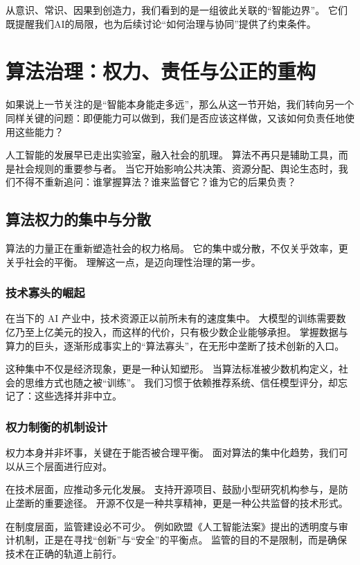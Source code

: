 从意识、常识、因果到创造力，我们看到的是一组彼此关联的“智能边界”。
它们既提醒我们AI的局限，也为后续讨论“如何治理与协同”提供了约束条件。

\section{算法治理：权力、责任与公正的重构}

如果说上一节关注的是“智能本身能走多远”，那么从这一节开始，我们转向另一个同样关键的问题：即便能力可以做到，我们是否应该这样做，又该如何负责任地使用这些能力？
 
人工智能的发展早已走出实验室，融入社会的肌理。
算法不再只是辅助工具，而是社会规则的重要参与者。
当它开始影响公共决策、资源分配、舆论生态时，我们不得不重新追问：谁掌握算法？谁来监督它？谁为它的后果负责？

\subsection{算法权力的集中与分散}

算法的力量正在重新塑造社会的权力格局。  
它的集中或分散，不仅关乎效率，更关乎社会的平衡。  
理解这一点，是迈向理性治理的第一步。

\subsubsection{技术寡头的崛起}

在当下的 AI 产业中，技术资源正以前所未有的速度集中。  
大模型的训练需要数亿乃至上亿美元的投入，而这样的代价，只有极少数企业能够承担。  
掌握数据与算力的巨头，逐渐形成事实上的“算法寡头”，在无形中垄断了技术创新的入口。

这种集中不仅是经济现象，更是一种认知塑形。  
当算法标准被少数机构定义，社会的思维方式也随之被“训练”。  
我们习惯于依赖推荐系统、信任模型评分，却忘记了：这些选择并非中立。

\subsubsection{权力制衡的机制设计}

权力本身并非坏事，关键在于能否被合理平衡。  
面对算法的集中化趋势，我们可以从三个层面进行应对。

在技术层面，应推动多元化发展。
支持开源项目、鼓励小型研究机构参与，是防止垄断的重要途径。
开源不仅是一种共享精神，更是一种公共监督的技术形式。

在制度层面，监管建设必不可少。
例如欧盟《人工智能法案》提出的透明度与审计机制，正是在寻找“创新”与“安全”的平衡点。
监管的目的不是限制，而是确保技术在正确的轨道上前行。

